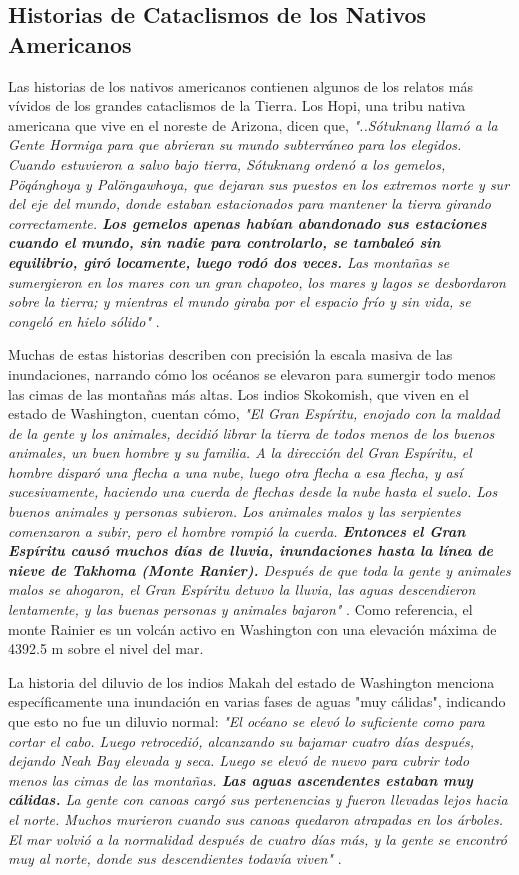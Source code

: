 \documentclass[10pt,twocolumn,letterpaper]{article}
\begin{document}
\subsection{Historias de Cataclismos de los Nativos Americanos}

Las historias de los nativos americanos contienen algunos de los relatos más vívidos de los grandes cataclismos de la Tierra. Los Hopi, una tribu nativa americana que vive en el noreste de Arizona, dicen que, \textit{"..Sótuknang llamó a la Gente Hormiga para que abrieran su mundo subterráneo para los elegidos. Cuando estuvieron a salvo bajo tierra, Sótuknang ordenó a los gemelos, Pöqánghoya y Palöngawhoya, que dejaran sus puestos en los extremos norte y sur del eje del mundo, donde estaban estacionados para mantener la tierra girando correctamente. \textbf{Los gemelos apenas habían abandonado sus estaciones cuando el mundo, sin nadie para controlarlo, se tambaleó sin equilibrio, giró locamente, luego rodó dos veces.} Las montañas se sumergieron en los mares con un gran chapoteo, los mares y lagos se desbordaron sobre la tierra; y mientras el mundo giraba por el espacio frío y sin vida, se congeló en hielo sólido"} \cite{4}.

Muchas de estas historias describen con precisión la escala masiva de las inundaciones, narrando cómo los océanos se elevaron para sumergir todo menos las cimas de las montañas más altas. Los indios Skokomish, que viven en el estado de Washington, cuentan cómo, \textit{"El Gran Espíritu, enojado con la maldad de la gente y los animales, decidió librar la tierra de todos menos de los buenos animales, un buen hombre y su familia. A la dirección del Gran Espíritu, el hombre disparó una flecha a una nube, luego otra flecha a esa flecha, y así sucesivamente, haciendo una cuerda de flechas desde la nube hasta el suelo. Los buenos animales y personas subieron. Los animales malos y las serpientes comenzaron a subir, pero el hombre rompió la cuerda. \textbf{Entonces el Gran Espíritu causó muchos días de lluvia, inundaciones hasta la línea de nieve de Takhoma (Monte Ranier).} Después de que toda la gente y animales malos se ahogaron, el Gran Espíritu detuvo la lluvia, las aguas descendieron lentamente, y las buenas personas y animales bajaron"} \cite{3}. Como referencia, el monte Rainier es un volcán activo en Washington con una elevación máxima de 4392.5 m sobre el nivel del mar.

La historia del diluvio de los indios Makah del estado de Washington menciona específicamente una inundación en varias fases de aguas "muy cálidas", indicando que esto no fue un diluvio normal: \textit{"El océano se elevó lo suficiente como para cortar el cabo. Luego retrocedió, alcanzando su bajamar cuatro días después, dejando Neah Bay elevada y seca. Luego se elevó de nuevo para cubrir todo menos las cimas de las montañas. \textbf{Las aguas ascendentes estaban muy cálidas.} La gente con canoas cargó sus pertenencias y fueron llevadas lejos hacia el norte. Muchos murieron cuando sus canoas quedaron atrapadas en los árboles. El mar volvió a la normalidad después de cuatro días más, y la gente se encontró muy al norte, donde sus descendientes todavía viven"} \cite{3}.
\end{document}

